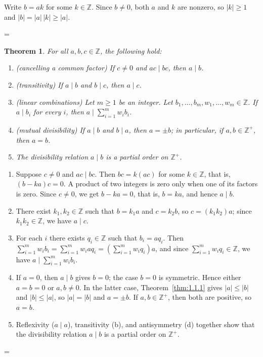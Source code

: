 \documentclass[11pt]{article}
\makeatletter
\theoremstyle{ntstyle}
\newtheorem{theorem}{Theorem}[subsection]
\let\nt@closedisplay\]
\def\nt@guardedclose{\@ifnextchar\par{\nt@closeafterpar}{\@ifnextchar\end{\postdisplaypenalty\@M\nt@closedisplay}{\nt@closedisplay}}}
\def\nt@closeafterpar\par{\@ifnextchar\par{\nt@closeafterpar}{\@ifnextchar\end{\postdisplaypenalty\@M\nt@closedisplay\par}{\nt@closedisplay\par}}}
\renewenvironment{proof}[1][\proofname]{\par
  \pushQED{\qed}\normalfont\topsep\medskipamount\edef\nt@afterproof{\@endparpenalty=\the\@endparpenalty\relax}\@beginparpenalty\@M\@endparpenalty\@M\let\]\nt@guardedclose\trivlist\item[]\textit{#1\@addpunct{.}} \ignorespaces}{\ifvmode\addpenalty\@M\fi\popQED\nt@afterproof\endtrivlist\@endpefalse}
\makeatother
\begin{document}
\begin{proof} Write $b = ak$ for some $k\in\mathbb{Z}$. Since $b \neq 0$, both $a$ and $k$
	are nonzero, so $|k| \ge 1$ and $|b| = |a|\,|k| \ge |a|$.

\end{proof}
\begin{theorem}\label{thm:1.1.2}
	For all $a,b,c\in\mathbb{Z}$, the following hold:

	\begin{enumerate}[label={\alph*)}]
		\item (cancelling a common factor) If $c\ne0$ and $ac\mid bc$, then $a\mid b$.
		\item (transitivity) If $a\mid b$ and $b\mid c$, then $a\mid c$.
		\item (linear combinations) Let $m\ge1$ be an integer.
		      Let $b_1,\ldots,b_m,w_1,\ldots,w_m\in\mathbb{Z}$. If $a\mid b_i$ for every $i$, then $a\mid\sum_{i=1}^{m}w_i b_i$.
		\item (mutual divisibility) If $a\mid b$ and $b\mid a$, then $a=\pm b$; in particular, if $a,b\in\mathbb{Z}^+$, then $a=b$.
		\item The divisibility relation $a\mid b$ is a partial order on $\mathbb{Z}^+$.
	\end{enumerate}

\end{theorem}

\begin{proof}

	\begin{enumerate}[label={\alph*)}]
		\item Suppose $c \neq 0$ and $ac \mid bc$. Then $bc = k(ac)$ for
		      some $k \in \mathbb{Z}$, that is, $(b - ka)c = 0$. A product of two integers is zero only when one of its
		      factors is zero. Since $c \neq 0$, we get $b - ka = 0$, that is, $b = ka$, and hence $a \mid b$.
		\item There exist $k_1, k_2 \in \mathbb{Z}$ such that $b = k_1 a$
		      and $c = k_2 b$, so $c = (k_1 k_2) a$; since $k_1 k_2 \in
			      \mathbb{Z}$, we have $a \mid c$.
		\item For each $i$ there exists $q_i \in \mathbb{Z}$ such that
		      $b_i = a q_i$. Then $\sum_{i=1}^{m} w_i b_i = \sum_{i=1}^{m} w_i a
			      q_i = \left(\sum_{i=1}^{m} w_i q_i\right) a$, and since
		      $\sum_{i=1}^{m} w_i q_i \in \mathbb{Z}$, we have $a \mid
			      \sum_{i=1}^{m} w_i b_i$.
		\item If $a=0$, then $a\mid b$ gives $b=0$; the case $b=0$ is symmetric.
		      Hence either $a=b=0$ or $a,b\ne0$. In the latter case, Theorem~\ref{thm:1.1.1} gives
		      $|a| \le |b|$ and $|b| \le |a|$, so $|a| = |b|$ and $a = \pm b$.
		      If $a, b \in \mathbb{Z}^+$, then both are positive, so $a = b$.
		\item Reflexivity ($a \mid a$), transitivity (b), and antisymmetry
		      (d) together show that the divisibility relation $a \mid b$ is a partial order on
		      $\mathbb{Z}^+$.
	\end{enumerate}

\end{proof}
\end{document}

